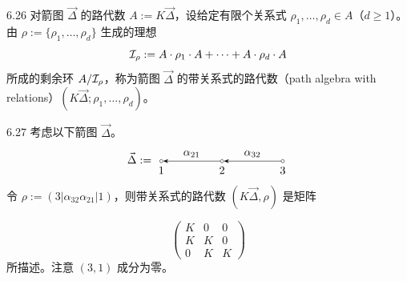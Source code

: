 \begin{definition}{6.26}
对箭图 $\vec{\Delta}$ 的路代数 $A:=K\vec{\Delta}$，设给定有限个关系式 $\rho_1,\dots,\rho_d\in A$（$d\ge 1$）。由 $\rho:=\{\rho_1,\dots,\rho_d\}$ 生成的理想
\[
\mathcal{I}_\rho:=A\cdot\rho_1\cdot A+\cdots+A\cdot\rho_d\cdot A
\]
所成的剩余环 $A/\mathcal{I}_\rho$，称为箭图 $\vec{\Delta}$ 的带关系式的路代数（path algebra with relations）$(K\vec{\Delta};\rho_1,\dots,\rho_d)$。
\end{definition}


\begin{example}{6.27}
考虑以下箭图 $\vec{\Delta}$。
\[
\vec{\Delta}:=
\begin{tikzpicture}[baseline=-0.5ex]
  \node[draw,circle,inner sep=1pt,label=below:{$1$}] (v1) at (0,0) {};
  \node[draw,circle,inner sep=1pt,label=below:{$2$}] (v2) at (1.9,0) {};
  \node[draw,circle,inner sep=1pt,label=below:{$3$}] (v3) at (3.8,0) {};
  \draw[-{Stealth}] (v2) -- node[above]{$\alpha_{21}$} (v1);
  \draw[-{Stealth}] (v3) -- node[above]{$\alpha_{32}$} (v2);
\end{tikzpicture}
\]
令 $\rho:=(3|\alpha_{32}\alpha_{21}|1)$，则带关系式的路代数 $(K\vec{\Delta},\rho)$ 是矩阵

\[
\begin{pmatrix}
K & 0 & 0\\
K & K & 0\\
0 & K & K
\end{pmatrix}
\]
所描述。注意 $(3,1)$ 成分为零。
\end{example}

